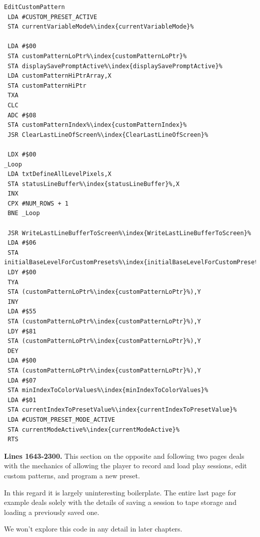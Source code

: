 \begin{minipage}[b]{0.33\linewidth}
\begin{lrbox}{\mybox}
\begin{lstlisting}[basicstyle=\ttfamily\tiny,escapechar=\%]
EditCustomPattern
 LDA #CUSTOM_PRESET_ACTIVE
 STA currentVariableMode%\index{currentVariableMode}%

 LDA #$00
 STA customPatternLoPtr%\index{customPatternLoPtr}%
 STA displaySavePromptActive%\index{displaySavePromptActive}%
 LDA customPatternHiPtrArray,X
 STA customPatternHiPtr
 TXA
 CLC
 ADC #$08
 STA customPatternIndex%\index{customPatternIndex}%
 JSR ClearLastLineOfScreen%\index{ClearLastLineOfScreen}%

 LDX #$00
_Loop   
 LDA txtDefineAllLevelPixels,X
 STA statusLineBuffer%\index{statusLineBuffer}%,X
 INX
 CPX #NUM_ROWS + 1
 BNE _Loop

 JSR WriteLastLineBufferToScreen%\index{WriteLastLineBufferToScreen}%
 LDA #$06
 STA initialBaseLevelForCustomPresets%\index{initialBaseLevelForCustomPresets}%
 LDY #$00
 TYA
 STA (customPatternLoPtr%\index{customPatternLoPtr}%),Y
 INY
 LDA #$55
 STA (customPatternLoPtr%\index{customPatternLoPtr}%),Y
 LDY #$81
 STA (customPatternLoPtr%\index{customPatternLoPtr}%),Y
 DEY
 LDA #$00
 STA (customPatternLoPtr%\index{customPatternLoPtr}%),Y
 LDA #$07
 STA minIndexToColorValues%\index{minIndexToColorValues}%
 LDA #$01
 STA currentIndexToPresetValue%\index{currentIndexToPresetValue}%
 LDA #CUSTOM_PRESET_MODE_ACTIVE
 STA currentModeActive%\index{currentModeActive}%
 RTS
\end{lstlisting}
\end{lrbox}%
\scalebox{0.8}{\usebox{\mybox}}
\end{minipage}
\clearpage
{}
\textbf{Lines 1643-2300.} This section on the opposite and following two pages deals with the mechanics of 
allowing the player to record and load play sessions, edit custom patterns, and program a new preset. 

In this regard it is largely uninteresting boilerplate. The entire last page for example deals solely with the
details of saving a session to tape storage and loading a previously saved one.

We won't explore this code in any detail in later chapters. 

